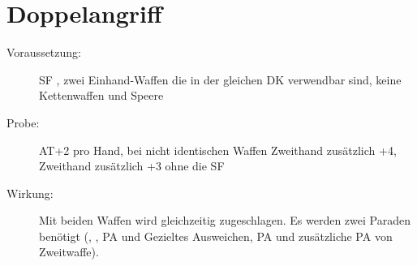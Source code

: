 \section{Doppelangriff}
\label{aktion.doppelangriff}
\begin{description}
    \item[Voraussetzung:]
        SF , zwei Einhand-Waffen die in der gleichen DK verwendbar sind, keine Kettenwaffen und Speere
    \item[Probe:]
        AT+2 pro Hand, bei nicht identischen Waffen Zweithand zusätzlich +4, Zweithand zusätzlich +3 ohne die SF 
    \item[Wirkung:]
        Mit beiden Waffen wird gleichzeitig zugeschlagen.
        Es werden zwei Paraden benötigt (, , PA und Gezieltes Ausweichen, PA und zusätzliche PA von Zweitwaffe).
\end{description}
